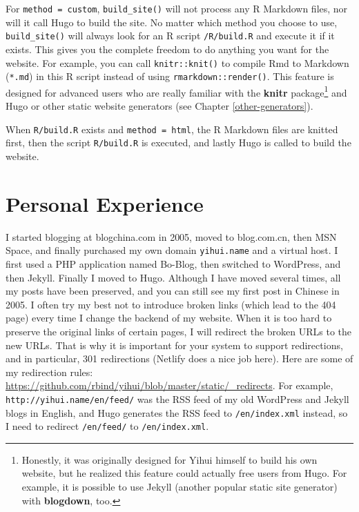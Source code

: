 \documentclass[12pt,]{krantz}
\theoremstyle{definition}
\theoremstyle{definition}
\theoremstyle{definition}
\theoremstyle{remark}
\begin{document}
For \texttt{method\ =\ \textquotesingle{}custom\textquotesingle{}},
\texttt{build\_site()} will not process any R Markdown files, nor will
it call Hugo to build the site. No matter which method you choose to
use, \texttt{build\_site()} will always look for an R script
\texttt{/R/build.R} and execute it if it exists. This gives you the
complete freedom to do anything you want for the website. For example,
you can call \texttt{knitr::knit()} to compile Rmd to Markdown
(\texttt{*.md}) in this R script instead of using
\texttt{rmarkdown::render()}. This feature is designed for advanced
users who are really familiar with the \textbf{knitr} package\footnote{Honestly,
  it was originally designed for Yihui himself to build his own website,
  but he realized this feature could actually free users from Hugo. For
  example, it is possible to use Jekyll (another popular static site
  generator) with \textbf{blogdown}, too.} and Hugo or other static
website generators (see Chapter \ref{other-generators}).

When \texttt{R/build.R} exists and
\texttt{method\ =\ \textquotesingle{}html\textquotesingle{}}, the R
Markdown files are knitted first, then the script \texttt{R/build.R} is
executed, and lastly Hugo is called to build the website.

\hypertarget{personal-experience}{%
\chapter{Personal Experience}\label{personal-experience}}

I started blogging at blogchina.com in 2005, moved to blog.com.cn, then
MSN Space, and finally purchased my own domain \texttt{yihui.name} and a
virtual host. I first used a PHP application named Bo-Blog, then
switched to WordPress, and then Jekyll. Finally I moved to Hugo.
Although I have moved several times, all my posts have been preserved,
and you can still see my first post in Chinese in 2005. I often try my
best not to introduce broken links (which lead to the 404 page) every
time I change the backend of my website. When it is too hard to preserve
the original links of certain pages, I will redirect the broken URLs to
the new URLs. That is why it is important for your system to support
redirections, and in particular, 301 redirections (Netlify does a nice
job here). Here are some of my redirection rules:
\url{https://github.com/rbind/yihui/blob/master/static/_redirects}. For
example, \texttt{http://yihui.name/en/feed/} was the RSS feed of my old
WordPress and Jekyll blogs in English, and Hugo generates the RSS feed
to \texttt{/en/index.xml} instead, so I need to redirect
\texttt{/en/feed/} to \texttt{/en/index.xml}.
\end{document}

